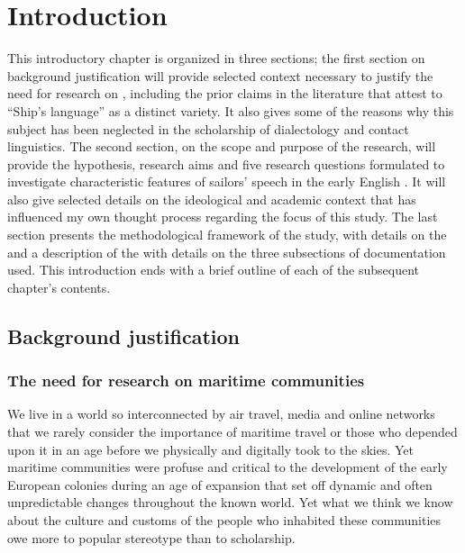 \chapter{Introduction}

This introductory chapter is organized in three sections; the first section on background justification will provide selected context necessary to justify the need for research on , including the prior claims in the literature that attest to “Ship’s language” as a distinct variety. It also gives some of the reasons why this subject has been neglected in the scholarship of dialectology and contact linguistics. The second section, on the scope and purpose of the research, will provide the hypothesis, research aims and five research questions formulated to investigate characteristic features of sailors’ speech in the early English . It will also give selected details on the ideological and academic context that has influenced my own thought process regarding the focus of this study. The last section presents the methodological framework of the study, with details on the  and a description of the  with details on the three subsections of documentation used. This introduction ends with a brief outline of each of the subsequent chapter’s contents.



\section{{Background justification} }\label{sec:1.1}



\subsection{{The need for research on maritime communities}}\label{sec:1.1.1}



We live in a world so interconnected by air travel, media and online networks that we rarely consider the importance of maritime travel or those who depended upon it in an age before we physically and digitally took to the skies. Yet maritime communities were profuse and critical to the development of the early European colonies during an age of expansion that set off dynamic and often unpredictable changes throughout the known world. Yet what we think we know about the culture and customs of the people who inhabited these communities owe more to popular stereotype than to scholarship. 



